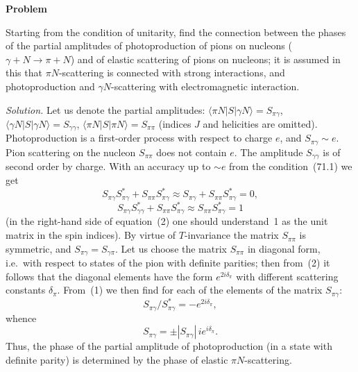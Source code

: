 \bigskip
\textbf{Problem}

Starting from the condition of unitarity, find the connection between the phases of the partial amplitudes of photoproduction of pions on nucleons ($\gamma + N \to \pi + N$) and of elastic scattering of pions on nucleons; it is assumed in this that $\pi N$-scattering is connected with strong interactions, and photoproduction and $\gamma N$-scattering with electromagnetic interaction.

\textit{Solution.} Let us denote the partial amplitudes: $\langle\pi N|S|\gamma N\rangle = S_{\pi\gamma}$, $\langle\gamma N|S|\gamma N\rangle = S_{\gamma\gamma}$, $\langle\pi N|S|\pi N\rangle = S_{\pi\pi}$ (indices $J$ and helicities are omitted). Photoproduction is a first-order process with respect to charge $e$, and $S_{\pi\gamma} \sim e$. Pion scattering on the nucleon $S_{\pi\pi}$ does not contain $e$. The amplitude $S_{\gamma\gamma}$ is of second order by charge. With an accuracy up to $\sim e$ from the condition~(71.1) we get
\[
S_{\pi\gamma}S^*_{\pi\gamma} + S_{\pi\pi}S^*_{\pi\gamma} \approx S_{\pi\gamma} + S_{\pi\pi}S^*_{\pi\gamma} = 0,\tag{1}
\]
\[
S_{\pi\gamma}S^*_{\gamma\gamma} + S_{\pi\pi}S^*_{\pi\gamma} \approx S_{\pi\pi}S^*_{\pi\gamma} = 1\tag{2}
\]
(in the right-hand side of equation~(2) one should understand~1 as the unit matrix in the spin indices). By virtue of $T$-invariance the matrix $S_{\pi\pi}$ is symmetric, and $S_{\pi\gamma} = S_{\gamma\pi}$. Let us choose the matrix $S_{\pi\pi}$ in diagonal form, i.e.\ with respect to states of the pion with definite parities; then from~(2) it follows that the diagonal elements have the form $e^{2i\delta_\pi}$ with different scattering constants $\delta_\pi$. From~(1) we then find for each of the elements of the matrix $S_{\pi\gamma}$:
\[
S_{\pi\gamma}/S^*_{\pi\gamma} = -e^{2i\delta_\pi},
\]
whence
\[
S_{\pi\gamma} = \pm |S_{\pi\gamma}|\,ie^{i\delta_\pi}.
\]
Thus, the phase of the partial amplitude of photoproduction (in a state with definite parity) is determined by the phase of elastic $\pi N$-scattering.
